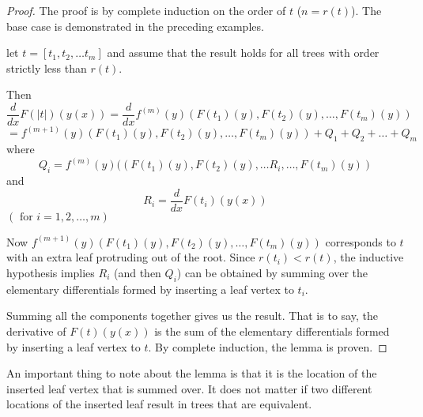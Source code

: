 \documentclass[12pt]{amsart}
\theoremstyle{definition}
\begin{document}
\begin{proof}
The proof is by complete induction on the order of $t$ ($n = r(t)$). 
The base case is demonstrated in the preceding examples.  

let $t = \left[t_1, t_2, \dots t_m\right]$ and assume that the result holds for all trees with 
order strictly less than $r(t)$. 

Then
$$\frac{d}{dx}F(|t|)(y(x)) = \frac{d}{dx} f^{(m)}(y)(F(t_1)(y),F(t_2)(y), \dots, F(t_m)(y))$$
$$= f^{(m+1)}(y)(F(t_1)(y),F(t_2)(y), \dots, F(t_m)(y)) + Q_1 + Q_2 + \dots + Q_m$$
where 
$$Q_i = f^{(m)}(y)((F(t_1)(y),F(t_2)(y), \dots R_i, \dots, F(t_m)(y))$$
and
$$R_i = \frac{d}{dx}F(t_i)(y(x))$$
\hfill  $(\mbox{ for } i = 1, 2, \dots, m)$

Now $ f^{(m+1)}(y)(F(t_1)(y),F(t_2)(y), \dots, F(t_m)(y))$ corresponds to $t$ with an extra leaf 
protruding out of the root. Since $r(t_i) < r(t)$, the inductive hypothesis implies $R_i$ (and then $Q_i$) 
can be obtained by summing over the elementary differentials formed by inserting a leaf vertex to $t_i$.

Summing all the components together gives us the result. That is to say, the derivative of $F(t)(y(x))$ is 
the sum of the elementary differentials formed by inserting a leaf vertex to $t$. 
By complete induction, the lemma is proven.
\end{proof}
 An important thing to note about the lemma is that it is the  location
of the inserted leaf vertex that is summed over. It does not matter if two different locations
of the inserted leaf result in trees that are equivalent. 
\end{document}
